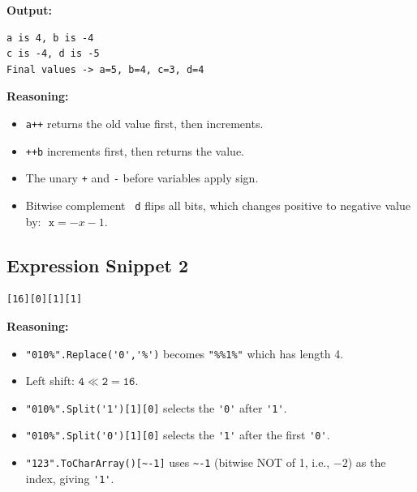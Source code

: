 \textbf{Output:}
\begin{verbatim}
a is 4, b is -4
c is -4, d is -5
Final values -> a=5, b=4, c=3, d=4
\end{verbatim}

\textbf{Reasoning:}
\begin{itemize}
    \item \texttt{a++} returns the old value first, then increments.
    \item \texttt{++b} increments first, then returns the value.
    \item The unary \texttt{+} and \texttt{-} before variables apply sign.
    \item Bitwise complement \texttt{~d} flips all bits, which changes positive to negative value by: \(\texttt{~x} = -x - 1\).
\end{itemize}

\subsection*{Expression Snippet 2}
\begin{verbatim}
[16][0][1][1]
\end{verbatim}

\textbf{Reasoning:}
\begin{itemize}
  \item \verb|"010%".Replace('0','%')| becomes \verb|"%%1%"| which has length 4.
  \item Left shift: \(\mathtt{4 \ll 2 = 16}\).
  \item \verb|"010%".Split('1')[1][0]| selects the \verb|'0'| after \verb|'1'|.
  \item \verb|"010%".Split('0')[1][0]| selects the \verb|'1'| after the first \verb|'0'|.
  \item \verb|"123".ToCharArray()[~-1]| uses \verb|~-1| (bitwise NOT of 1, i.e., \(-2\)) as the index, giving \verb|'1'|.
\end{itemize}


